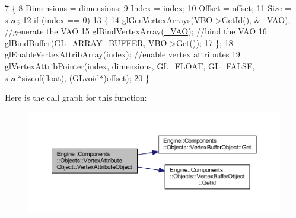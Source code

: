 \begin{DoxyCode}
7 \{
8     \mbox{\hyperlink{classEngine_1_1Components_1_1Objects_1_1VertexAttributeObject_aa440859216dad8d94b7a56d4d105fadf}{Dimensions}} = dimensions;
9     \mbox{\hyperlink{classEngine_1_1Components_1_1Objects_1_1VertexAttributeObject_a854d40f88b9c4cd8e57be7a3d3f72e39}{Index}} = index;
10     \mbox{\hyperlink{classEngine_1_1Components_1_1Objects_1_1VertexAttributeObject_a2eadc0a67482dfff8bc65d91e2e974b9}{Offset}} = offset;
11     \mbox{\hyperlink{classEngine_1_1Components_1_1Objects_1_1VertexAttributeObject_aadad45ab6562ea5054b5ce9761c1f2d1}{Size}} = size;
12     \textcolor{keywordflow}{if} (index == 0)
13     \{
14         glGenVertexArrays(VBO->GetId(), &\mbox{\hyperlink{classEngine_1_1Components_1_1Objects_1_1VertexAttributeObject_a66edf6b8734008170901528cb3b07802}{\_VAO}}); \textcolor{comment}{//generate the VAO}
15         glBindVertexArray(\mbox{\hyperlink{classEngine_1_1Components_1_1Objects_1_1VertexAttributeObject_a66edf6b8734008170901528cb3b07802}{\_VAO}}); \textcolor{comment}{//bind the VAO}
16         glBindBuffer(GL\_ARRAY\_BUFFER, VBO->Get());
17     \};
18     glEnableVertexAttribArray(index); \textcolor{comment}{//enable vertex attributes}
19     glVertexAttribPointer(index, dimensions, GL\_FLOAT, GL\_FALSE, size*\textcolor{keyword}{sizeof}(\textcolor{keywordtype}{float}), (GLvoid*)offset);
20 \}
\end{DoxyCode}
Here is the call graph for this function\+:
\nopagebreak
\begin{figure}[H]
\begin{center}
\leavevmode
\includegraphics[width=350pt]{classEngine_1_1Components_1_1Objects_1_1VertexAttributeObject_a1439a87dfc4f350a31e97a40a5cc1c3d_cgraph}
\end{center}
\end{figure}
\mbox{\label{classEngine_1_1Components_1_1Objects_1_1VertexAttributeObject_afab852c51905d30eba2c9e470fe621aa}} 
